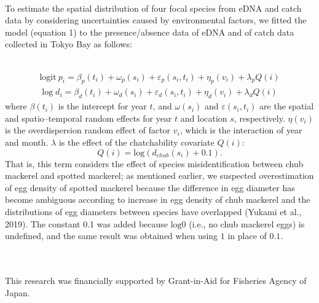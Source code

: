 \documentclass[12pt]{article}
\begin{document}
\begin{linenumbers}
\\
To estimate the spatial distribution of four focal species from eDNA and catch data by considering uncertainties caused by environmental factors, we fitted the model (equation 1) to the presence/absence data of eDNA and of catch data collected in Tokyo Bay as follows:



\\
\begin{equation}
\begin{array}{ll}
\mathrm{logit}\ p_{i} = \beta_{p}(t_{i}) + \omega_{p}(s_{i}) + \varepsilon_{p}(s_{i}, t_{i}) + \eta_{p}(v_{i}) + \lambda_{p}Q(i)\\
\log d_{i} = \beta_{d}(t_{i}) + \omega_{d}(s_{i}) + \varepsilon_{d}(s_{i}, t_{i}) + \eta_{d}(v_{i}) + \lambda_{d}Q(i)
\end{array}
\end{equation}
where $\beta(t_{i})$ is the intercept for year $t$, and $\omega(s_{i})$ and $\varepsilon(s_{i}, t_{i})$ are the spatial and spatio--temporal random effects for year $t$ and location $s$, respectively. $\eta(v_{i})$ is the overdispersion random effect of factor $v_{i}$, which is the interaction of year and month. 
$\lambda$ is the effect of the chatchability covariate $Q(i)$: 
\[
Q(i) = \mathrm{log} (d_{chub}(s_{i})+0.1). 
\]
That is, this term considers the effect of species misidentification between chub mackerel and spotted mackerel; as mentioned earlier, we suspected overestimation of egg density of spotted mackerel because the difference in egg diameter has become ambiguous according to increase in egg density of chub mackerel and the distributions of egg diameters between species have overlapped (Yukami et al., 2019). The constant 0.1 was added because $\mathrm{log} 0$ (i.e., no chub mackerel eggs) is undefined, and the same result was obtained when using $1$ in place of $0.1$.



\ \\
\\
This research was financially supported by Grant-in-Aid for Fisheries Agency of Japan.
\ \\


\end{linenumbers}
\end{document}
